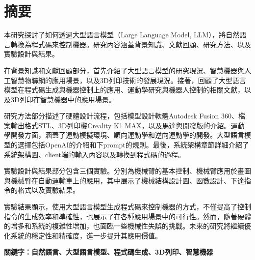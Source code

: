 \documentclass[class=NCU_thesis, crop=false]{standalone}
\begin{document}
\chapter{摘要}

本研究探討了如何透過大型語言模型（Large Language Model, LLM），將自然語言轉換為程式碼來控制機器。研究內容涵蓋背景知識、文獻回顧、研究方法、以及實驗設計與結果。

在背景知識和文獻回顧部分，首先介紹了大型語言模型的研究現況、智慧機器與人工智慧物聯網的應用場景，以及3D列印技術的發展現況。接著，回顧了大型語言模型在程式碼生成與機器控制上的應用、運動學研究與機器人控制的相關文獻，以及3D列印在智慧機器中的應用場景。

研究方法部分描述了硬體設計流程，包括模型設計軟體Autodesk Fusion 360、檔案輸出格式STL、3D列印機Creality K1 MAX，以及馬達與開發版的介紹。運動學開發方面，涵蓋了運動模擬環境、順向運動學和逆向運動學的開發。大型語言模型的選擇包括OpenAI的介紹和下prompt的規則。最後，系統架構章節詳細介紹了系統架構圖、client端的輸入內容以及轉換到程式碼的過程。

實驗設計與結果部分包含三個實驗。分別為機械臂的基本控制、機械臂應用於畫圖與機械臂在自動運輸車上的應用，其中展示了機械結構設計圖、函數設計、下達指令的格式以及實驗結果。

實驗結果顯示，使用大型語言模型生成程式碼來控制機器的方式，不僅提高了控制指令的生成效率和準確性，也展示了在各種應用場景中的可行性。然而，隨著硬體的增多和系統的複雜性增加，也面臨一些機械性失誤的挑戰。未來的研究將繼續優化系統的穩定性和精確度，進一步提升其應用價值。

\vspace{2em}
\noindent \textbf{關鍵字：自然語言、大型語言模型、程式碼生成、3D列印、智慧機器} \keywordsZh{} %
\end{document}
